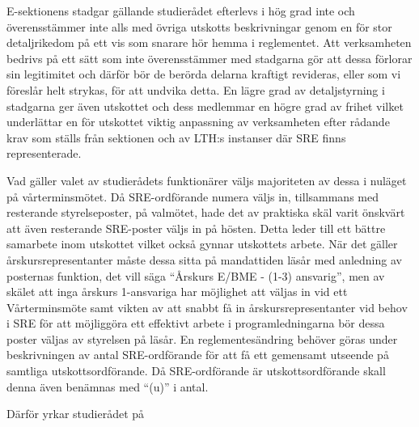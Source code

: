 \documentclass[10pt]{article}
\begin{document}
    E-sektionens stadgar gällande studierådet efterlevs i hög grad inte och överensstämmer inte alls med övriga utskotts beskrivningar genom en för stor detaljrikedom på ett vis som snarare hör hemma i reglementet. Att verksamheten bedrivs på ett sätt som inte överensstämmer med stadgarna gör att dessa förlorar sin legitimitet och därför bör de berörda delarna kraftigt revideras, eller som vi föreslår helt strykas, för att undvika detta. En lägre grad av detaljstyrning i stadgarna ger även utskottet och dess medlemmar en högre grad av frihet vilket underlättar en för utskottet viktig anpassning av verksamheten efter rådande krav som ställs från sektionen och av LTH:s instanser där SRE finns representerade.

    Vad gäller valet av studierådets funktionärer väljs majoriteten av dessa i nuläget på vårterminsmötet. Då SRE-ordförande numera väljs in, tillsammans med resterande styrelseposter, på valmötet, hade det av praktiska skäl varit önskvärt att även resterande SRE-poster väljs in på hösten. Detta leder till ett bättre samarbete inom utskottet vilket också gynnar utskottets arbete. När det gäller årskursrepresentanter måste dessa sitta på mandattiden läsår med anledning av posternas funktion, det vill säga ``Årskurs E/BME - (1-3) ansvarig'', men av skälet att inga årskurs 1-ansvariga har möjlighet att väljas in vid ett Vårterminsmöte samt vikten av att snabbt få in årskursrepresentanter vid behov i SRE för att möjliggöra ett effektivt arbete i programledningarna bör dessa poster väljas av styrelsen på läsår. En reglementesändring behöver göras under beskrivningen av antal SRE-ordförande för att få ett gemensamt utseende på samtliga utskottsordförande. Då SRE-ordförande är utskottsordförande skall denna även benämnas med ``(u)'' i antal.

    Därför yrkar studierådet på
\end{document}
